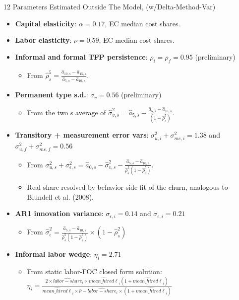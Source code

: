 \documentclass[11pt,aspectratio=169]{beamer}
\begin{document}
\begin{frame}{12 Parameters Estimated Outside The Model, (w/Delta-Method-Var)}

\begin{itemize}
    \item \textbf{Capital elasticity}: $\alpha = 0.17$, EC median cost shares.
    \item \textbf{Labor elasticity}: $\nu = 0.59$, EC median cost shares. 
    \item \textbf{Informal and formal TFP persistence}: $\rho_i = \rho_f = 0.95$ (preliminary)
    \begin{itemize}
        \item From $\hat{\rho}_s^5 = \frac{\hat{a}_{10,s} - \hat{a}_{15,s}}{\hat{a}_{5,s} - \hat{a}_{10,s}}$.
    \end{itemize}
    \item \textbf{Permanent type s.d.}: $\sigma_v = 0.56$ (preliminary)
    \begin{itemize}
        \item From the two s average of $\hat{\sigma}_{v,s}^2 = \hat{a}_{5,s} - \frac{\hat{a}_{5,s} - \hat{a}_{10,s}}{(1-\hat{\rho}_s^5)} $.
    \end{itemize}
    \item \textbf{Transitory + measurement error vars}: $\sigma_{u,i}^2 +\sigma_{me,i}^2 = 1.38 $ and $\sigma_{u,f}^2 +\sigma_{me,f}^2 = 0.56 $
    \begin{itemize}
        \item From $\sigma_{u,s}^2 +\sigma_{\epsilon,s}^2 = \hat{a}_{0,s} - \hat{\sigma}_{v,s}^2 - \frac{\hat{a}_{5,s} - \hat{a}_{10,s}}{\hat{\rho}_s^5(1-\hat{\rho}_s^5)} $.
        \item Real share resolved by behavior-side fit of the churn, analogous to Blundell et al. (2008).
    \end{itemize}
    \item \textbf{AR1 innovation variance}: $\sigma_{\epsilon,i } = 0.14$ and $\sigma_{\epsilon,i } = 0.21$
    \begin{itemize}
        \item From $\hat{\sigma}_{\epsilon}^2 = \frac{\hat{a}_{5,s} - \hat{a}_{10,s}}{\hat{\rho}_s^5(1-\hat{\rho}_s^5)} \times (1 - \hat{\rho}_s^2) $
    \end{itemize}
    \item \textbf{Informal labor wedge}: $\eta_i = 2.71$
    \begin{itemize}
        \item From static labor-FOC closed form solution: $\eta_i = \frac{2\times\widehat{labor-share}_i\times\widehat{mean\_hired\ell}_i(1+\widehat{mean\_hired\ell}_i)}{\widehat{mean\_hired\ell}_i \times \hat{\nu} - \widehat{labor-share}_i \times (1+\widehat{mean\_hired\ell}_i)}$

\end{itemize}
\end{itemize}
\end{frame}
\end{document}
